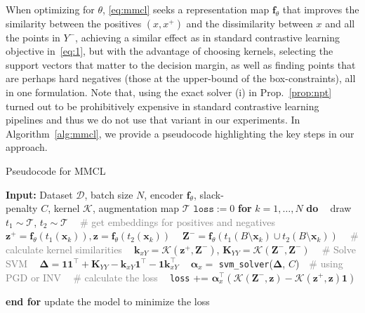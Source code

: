 \documentclass[letterpaper]{article} \usepackage{aaai22}  \usepackage{times}  \usepackage{helvet}  \usepackage{courier}  \usepackage[hyphens]{url}  \usepackage{graphicx} \urlstyle{rm} \def\UrlFont{\rm}  \usepackage{natbib}  \usepackage{caption} \DeclareCaptionStyle{ruled}{labelfont=normalfont,labelsep=colon,strut=off} \frenchspacing  \setlength{\pdfpagewidth}{8.5in}  \setlength{\pdfpageheight}{11in}
\newcommand{\vx}{x}\newcommand{\px}{x^+}\newcommand{\nx}{x^{-}} \newcommand{\vz}{\bm{z}}
\newcommand{\pz}{\bm{z}^+}
\newcommand{\valpha}{\bm{\alpha}}
\newcommand{\one}{\bm{1}}
\newcommand{\tone}{\bm{1}^{\!\top}}
\newcommand{\dataset}{\mathcal{D}}
\newcommand{\kxy}{\bm{k}_{xY}}
\newcommand{\Kyy}{\bm{K}_{YY}}
\newcommand{\mDel}{\bm{\Delta}}
\newcommand{\nY}{Y^{-}}\newcommand{\mK}{\bm{K}}
\newcommand{\nmZ}{{\bm{Z}}^{-}}
\newcommand{\kernel}{\mathcal{K}}
\newcommand{\ft}{\bm{f}_\theta}
\begin{document}
When optimizing for $\theta$, \eqref{eq:mmcl} seeks a representation map $\ft$ that improves the similarity between the positives $(\vx,\px)$ and the dissimilarity between $\vx$ and all the points in $\nY$, achieving a similar effect as in standard contrastive learning objective in~\eqref{eq:1}, but with the advantage of choosing kernels, selecting the support vectors that matter to the decision margin, as well as finding points that are perhaps hard negatives (those at the upper-bound of the box-constraints), all in one formulation. Note that, using the exact solver (i) in Prop.~\ref{prop:npt} turned out to be prohibitively expensive in standard contrastive learning pipelines and thus we do not use that variant in our experiments. In Algorithm~\ref{alg:mmcl}, we provide a pseudocode highlighting the key steps in our approach.

\begin{algorithm}[!t]
\caption{\label{alg:mmcl} Pseudocode for MMCL}
\begin{algorithmic}
    \STATE \textbf{Input:} Dataset $\dataset$, batch size $N$, encoder $\ft$, slack- \\penalty $C$, kernel $\mathcal{K}$, augmentation map $\mathcal{T}$
    \FOR{minibatch $B = \{\bm x_k\}_{k=1}^N\sim\dataset$}
    \STATE $\texttt{loss} := 0$
    \STATE \textbf{for} $k = 1, \ldots, N$ \textbf{do}
        \STATE $~~~~$draw $t_1 \!\sim\! \mathcal{T}$, $t_2 \!\sim\! \mathcal{T}$
        \STATE $~~~~$\textcolor{gray}{\# get embeddings for positives and negatives}
        \STATE $~~~~$$\pz = \ft(t_1(\bm x_k)), \vz = \ft(t_2(\bm x_k))$
        \STATE $~~~~$$\nmZ = \ft(t_1(B \setminus \bm x_k)\cup t_2(B \setminus \bm x_k))$
        \STATE $~~~~$\textcolor{gray}{\# calculate kernel similarities}
        \STATE $~~~~$$\kxy = \kernel(\pz, \nmZ)$, $\Kyy = \kernel(\nmZ, \nmZ)$
        \STATE $~~~~$\textcolor{gray}{\# Solve SVM}
        \STATE $~~~~$$\mDel=\one\tone + \Kyy - \kxy\tone - \one\kxy^{\top}$
        \STATE $~~~~$$\valpha_{\vx} = $ \texttt{svm\_solver}($\mDel$, $C$)~~\textcolor{gray} {\# using PGD or INV}
        \STATE $~~~~$\textcolor{gray}{\# calculate the loss}
        \STATE $~~~~$\texttt{loss} += $ \valpha_x^{\top}\left(\kernel(\nmZ, \vz) - \kernel(\pz, \vz)\one\right)$
        
    \STATE \textbf{end for}
    \STATE update the model to minimize the loss
    \ENDFOR
\end{algorithmic}
\end{algorithm}
\end{document}
